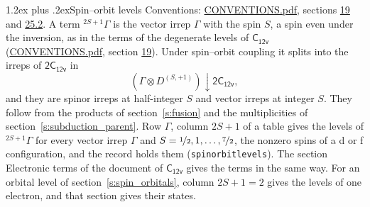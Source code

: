 \documentclass[10pt,a4paper]{article}
\makeatletter
\renewcommand\section{\@startsection{section}{1}{\z@}{-3ex plus -1ex minus -.2ex}%
  {1.2ex plus .2ex}{\normalfont\large\sffamily\bfseries\color{parttitle}}}
\numberwithin{equation}{section}
\newcommand{\grp}[1]{\mathsf{#1}}
\newcommand{\restr}[2]{#1\!\downarrow#2}
\newcommand{\irrJp}[2]{D^{(#1,#2)}}
\newcommand{\irrprod}{\otimes}
\newcommand{\term}[2]{{}^{#1}#2}
\makeatother
\begin{document}
\section{Spin--orbit levels}\label{s:spin_orbit}
Conventions: \href{../../CONVENTIONS.pdf}{CONVENTIONS.pdf}, sections \href{../../../rotation/CONVENTIONS.pdf\#conv.19}{19} and \href{../../CONVENTIONS.pdf\#conv.25.2}{25.2}.
\leavevmode\label{n:local.spin}\label{n:symbol.term}A term $\term{2S+1}{\Gamma}$ is the vector irrep $\Gamma$ with the spin $S$, a spin even under the inversion, as in the terms of the degenerate levels of \href{../../../rotation/data/pdf/C12v.pdf}{$\grp{C_{12v}}$} (\href{../../CONVENTIONS.pdf}{CONVENTIONS.pdf}, section \href{../../../rotation/CONVENTIONS.pdf\#conv.19}{19}). Under spin--orbit coupling it splits into the irreps of $\grp{2C_{12v}}$ in
\begin{equation}\label{e:spinorbit}\restr{(\Gamma \irrprod \irrJp{S}{+1})}{\grp{2C_{12v}}},\end{equation}
and they are spinor irreps at half-integer $S$ and vector irreps at integer $S$. They follow from the products of section~\ref{s:fusion} and the multiplicities of section~\ref{s:subduction_parent}. Row $\Gamma$, column $2S + 1$ of a table gives the levels of $\term{2S+1}{\Gamma}$ for every vector irrep $\Gamma$ and $S = \nicefrac{1}{2}, 1, \dots, \nicefrac{7}{2}$, the nonzero spins of a d or f configuration, and the record holds them (\texttt{spinorbitlevels}). The section Electronic terms of the document of \href{../../../rotation/data/pdf/C12v.pdf}{$\grp{C_{12v}}$} gives the terms in the same way. For an orbital level of section~\ref{s:spin_orbitals}, column $2S + 1 = 2$ gives the levels of one electron, and that section gives their states.
\end{document}
